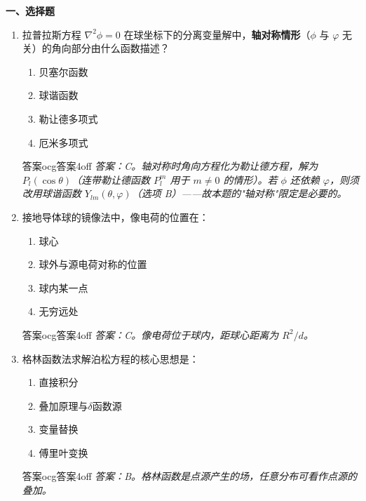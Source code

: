 \documentclass[11pt,a4paper,openany,oneside]{book}
\newcommand{\lap}{\nabla^2}
\begin{document}
\begin{miniquiz}
\textbf{一、选择题}
\begin{enumerate}[label=\arabic*.]
\item 拉普拉斯方程 $\lap\phi = 0$ 在球坐标下的分离变量解中，\textbf{轴对称情形}（$\phi$ 与 $\varphi$ 无关）的角向部分由什么函数描述？
  \begin{enumerate}[label=(\Alph*),nosep]
  \item 贝塞尔函数
  \item 球谐函数
  \item 勒让德多项式
  \item 厄米多项式
  \end{enumerate}
\begin{ocg}{答案}{ocg答案4}{off}
  \textit{答案：C。轴对称时角向方程化为勒让德方程，解为 $P_l(\cos\theta)$（连带勒让德函数 $P_l^m$ 用于 $m\neq0$ 的情形）。若 $\phi$ 还依赖 $\varphi$，则须改用球谐函数 $Y_{lm}(\theta,\varphi)$（选项 B）——故本题的"轴对称"限定是必要的。}
\end{ocg}

\item 接地导体球的镜像法中，像电荷的位置在：
  \begin{enumerate}[label=(\Alph*),nosep]
  \item 球心
  \item 球外与源电荷对称的位置
  \item 球内某一点
  \item 无穷远处
  \end{enumerate}
\begin{ocg}{答案}{ocg答案4}{off}
  \textit{答案：C。像电荷位于球内，距球心距离为 $R^2/d$。}
\end{ocg}

\item 格林函数法求解泊松方程的核心思想是：
  \begin{enumerate}[label=(\Alph*),nosep]
  \item 直接积分
  \item 叠加原理与$\delta$函数源
  \item 变量替换
  \item 傅里叶变换
  \end{enumerate}
\begin{ocg}{答案}{ocg答案4}{off}
  \textit{答案：B。格林函数是点源产生的场，任意分布可看作点源的叠加。}
\end{ocg}
\end{enumerate}


\end{miniquiz}
\end{document}
